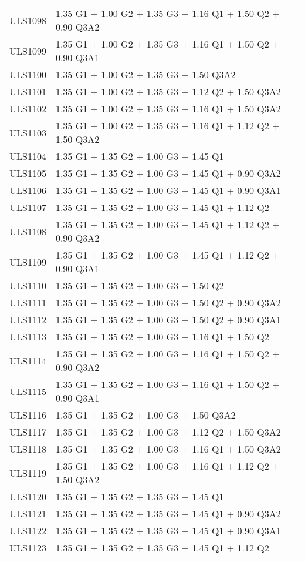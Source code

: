 \begin{center}
\begin{small}
\begin{longtable}{|l|p{10cm}|}
ULS1098 & 1.35 G1 + 1.00 G2 + 1.35 G3 + 1.16 Q1 + 1.50 Q2 + 0.90 Q3A2\\
ULS1099 & 1.35 G1 + 1.00 G2 + 1.35 G3 + 1.16 Q1 + 1.50 Q2 + 0.90 Q3A1\\
ULS1100 & 1.35 G1 + 1.00 G2 + 1.35 G3 + 1.50 Q3A2\\
ULS1101 & 1.35 G1 + 1.00 G2 + 1.35 G3 + 1.12 Q2 + 1.50 Q3A2\\
ULS1102 & 1.35 G1 + 1.00 G2 + 1.35 G3 + 1.16 Q1 + 1.50 Q3A2\\
ULS1103 & 1.35 G1 + 1.00 G2 + 1.35 G3 + 1.16 Q1 + 1.12 Q2 + 1.50 Q3A2\\
ULS1104 & 1.35 G1 + 1.35 G2 + 1.00 G3 + 1.45 Q1\\
ULS1105 & 1.35 G1 + 1.35 G2 + 1.00 G3 + 1.45 Q1 + 0.90 Q3A2\\
ULS1106 & 1.35 G1 + 1.35 G2 + 1.00 G3 + 1.45 Q1 + 0.90 Q3A1\\
ULS1107 & 1.35 G1 + 1.35 G2 + 1.00 G3 + 1.45 Q1 + 1.12 Q2\\
ULS1108 & 1.35 G1 + 1.35 G2 + 1.00 G3 + 1.45 Q1 + 1.12 Q2 + 0.90 Q3A2\\
ULS1109 & 1.35 G1 + 1.35 G2 + 1.00 G3 + 1.45 Q1 + 1.12 Q2 + 0.90 Q3A1\\
ULS1110 & 1.35 G1 + 1.35 G2 + 1.00 G3 + 1.50 Q2\\
ULS1111 & 1.35 G1 + 1.35 G2 + 1.00 G3 + 1.50 Q2 + 0.90 Q3A2\\
ULS1112 & 1.35 G1 + 1.35 G2 + 1.00 G3 + 1.50 Q2 + 0.90 Q3A1\\
ULS1113 & 1.35 G1 + 1.35 G2 + 1.00 G3 + 1.16 Q1 + 1.50 Q2\\
ULS1114 & 1.35 G1 + 1.35 G2 + 1.00 G3 + 1.16 Q1 + 1.50 Q2 + 0.90 Q3A2\\
ULS1115 & 1.35 G1 + 1.35 G2 + 1.00 G3 + 1.16 Q1 + 1.50 Q2 + 0.90 Q3A1\\
ULS1116 & 1.35 G1 + 1.35 G2 + 1.00 G3 + 1.50 Q3A2\\
ULS1117 & 1.35 G1 + 1.35 G2 + 1.00 G3 + 1.12 Q2 + 1.50 Q3A2\\
ULS1118 & 1.35 G1 + 1.35 G2 + 1.00 G3 + 1.16 Q1 + 1.50 Q3A2\\
ULS1119 & 1.35 G1 + 1.35 G2 + 1.00 G3 + 1.16 Q1 + 1.12 Q2 + 1.50 Q3A2\\
ULS1120 & 1.35 G1 + 1.35 G2 + 1.35 G3 + 1.45 Q1\\
ULS1121 & 1.35 G1 + 1.35 G2 + 1.35 G3 + 1.45 Q1 + 0.90 Q3A2\\
ULS1122 & 1.35 G1 + 1.35 G2 + 1.35 G3 + 1.45 Q1 + 0.90 Q3A1\\
ULS1123 & 1.35 G1 + 1.35 G2 + 1.35 G3 + 1.45 Q1 + 1.12 Q2\\

\end{longtable}
\end{small}
\end{center}
